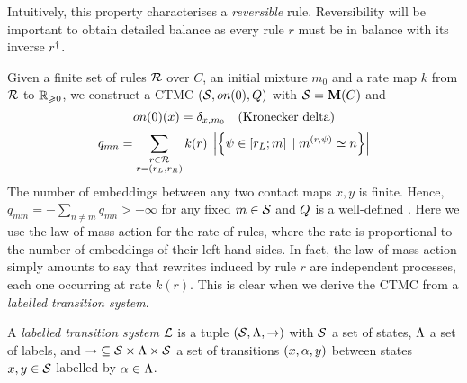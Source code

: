 Intuitively, this property characterises a \emph{reversible} rule.
Reversibility will be important to obtain detailed balance as
every rule $r$ must be in balance with its inverse $r^\dagger$.

Given a finite set of rules $\mathcal{R}$ over $C$,
an initial mixture $m_0$
and a rate map $k$ from $\mathcal{R}$ to $\mathbb{R}_{\geqslant 0}$,
we construct a CTMC $\left(\mathcal{S}, on(0), Q\right)$ %
with $\mathcal{S} = \mathbf{M}(C)$ and
\[ on(0)(x) = \delta_{x,m_0} \quad\text{(Kronecker delta)} \]
\begin{equation}
  \label{eq:kappa-ctmc}
  q_{mn} = \sum_{\substack{r \in \mathcal{R}\\r = \left(r_L,r_R\right)}}
    k(r) \; \left\lvert \left\{ \psi \in \left[r_L;m\right] \; | \; 
      m^{(r,\psi)} \simeq n \right\} \right\rvert
\end{equation}
The number of embeddings
between any two contact maps $x,y$ is finite.
Hence, $q_{mm} = -\sum_{n \neq m} q_{mn} > -\infty$
for any fixed $m \in \mathcal{S}$
and $Q$ is a well-defined \qmatrix.
Here we use the law of mass action for the rate of rules,
where the rate is proportional to the number of embeddings %
of their left-hand sides. %
In fact, the law of mass action simply amounts to say that
rewrites induced by rule $r$ are independent processes,
each one occurring at rate $k(r)$.
This is clear when we derive the CTMC from
a \emph{labelled transition system}. %

\begin{definition}
  A \emph{labelled transition system} $\mathcal{L}$ is a tuple
  $\left(\mathcal{S},\Lambda,\to\right)$ with
  $\mathcal{S}$ a set of states,
  $\Lambda$ a set of labels,
  and $\to\; \subseteq \mathcal{S} \times \Lambda \times \mathcal{S}$
  a set of transitions $\left(x,\alpha,y\right)$
  between states $x,y \in \mathcal{S}$
  labelled by $\alpha \in \Lambda$.
\end{definition}


